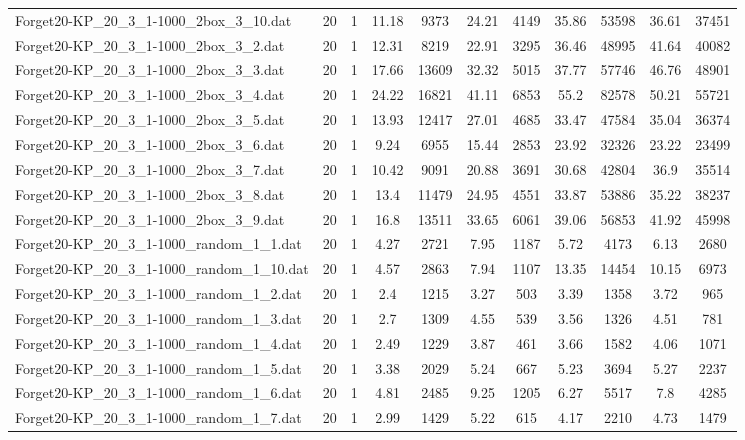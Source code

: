 \begin{table}[!ht]
\begin{tabular}{lcccccccccc}
Forget20-KP\_20\_3\_1-1000\_2box\_3\_10.dat & 20 & 1 & 11.18 & 9373 & 24.21 & 4149 & 35.86 & 53598 & 36.61 & 37451 \\
Forget20-KP\_20\_3\_1-1000\_2box\_3\_2.dat & 20 & 1 & 12.31 & 8219 & 22.91 & 3295 & 36.46 & 48995 & 41.64 & 40082 \\
Forget20-KP\_20\_3\_1-1000\_2box\_3\_3.dat & 20 & 1 & 17.66 & 13609 & 32.32 & 5015 & 37.77 & 57746 & 46.76 & 48901 \\
Forget20-KP\_20\_3\_1-1000\_2box\_3\_4.dat & 20 & 1 & 24.22 & 16821 & 41.11 & 6853 & 55.2 & 82578 & 50.21 & 55721 \\
Forget20-KP\_20\_3\_1-1000\_2box\_3\_5.dat & 20 & 1 & 13.93 & 12417 & 27.01 & 4685 & 33.47 & 47584 & 35.04 & 36374 \\
Forget20-KP\_20\_3\_1-1000\_2box\_3\_6.dat & 20 & 1 & 9.24 & 6955 & 15.44 & 2853 & 23.92 & 32326 & 23.22 & 23499 \\
Forget20-KP\_20\_3\_1-1000\_2box\_3\_7.dat & 20 & 1 & 10.42 & 9091 & 20.88 & 3691 & 30.68 & 42804 & 36.9 & 35514 \\
Forget20-KP\_20\_3\_1-1000\_2box\_3\_8.dat & 20 & 1 & 13.4 & 11479 & 24.95 & 4551 & 33.87 & 53886 & 35.22 & 38237 \\
Forget20-KP\_20\_3\_1-1000\_2box\_3\_9.dat & 20 & 1 & 16.8 & 13511 & 33.65 & 6061 & 39.06 & 56853 & 41.92 & 45998 \\
Forget20-KP\_20\_3\_1-1000\_random\_1\_1.dat & 20 & 1 & 4.27 & 2721 & 7.95 & 1187 & 5.72 & 4173 & 6.13 & 2680 \\
Forget20-KP\_20\_3\_1-1000\_random\_1\_10.dat & 20 & 1 & 4.57 & 2863 & 7.94 & 1107 & 13.35 & 14454 & 10.15 & 6973 \\
Forget20-KP\_20\_3\_1-1000\_random\_1\_2.dat & 20 & 1 & 2.4 & 1215 & 3.27 & 503 & 3.39 & 1358 & 3.72 & 965 \\
Forget20-KP\_20\_3\_1-1000\_random\_1\_3.dat & 20 & 1 & 2.7 & 1309 & 4.55 & 539 & 3.56 & 1326 & 4.51 & 781 \\
Forget20-KP\_20\_3\_1-1000\_random\_1\_4.dat & 20 & 1 & 2.49 & 1229 & 3.87 & 461 & 3.66 & 1582 & 4.06 & 1071 \\
Forget20-KP\_20\_3\_1-1000\_random\_1\_5.dat & 20 & 1 & 3.38 & 2029 & 5.24 & 667 & 5.23 & 3694 & 5.27 & 2237 \\
Forget20-KP\_20\_3\_1-1000\_random\_1\_6.dat & 20 & 1 & 4.81 & 2485 & 9.25 & 1205 & 6.27 & 5517 & 7.8 & 4285 \\
Forget20-KP\_20\_3\_1-1000\_random\_1\_7.dat & 20 & 1 & 2.99 & 1429 & 5.22 & 615 & 4.17 & 2210 & 4.73 & 1479 \\

\end{tabular}
\end{table}
